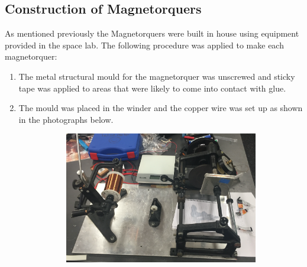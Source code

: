 \subsection{Construction of Magnetorquers}
As mentioned previously the Magnetorquers were built in house using equipment provided in the space lab.  The following procedure was applied to make each magnetorquer:
\begin{enumerate}
	\item The metal structural mould for the magnetorquer was unscrewed and sticky tape was applied to areas that were likely to come into contact with glue.
	\item The mould was placed in the winder and the copper wire was set up as shown in the photographs below.
	\begin{center}
	\begin{figure}[H]
	\caption{Magnetorquer Construction Set Up}
	\begin{subfigure}{0.5\textwidth}
	\includegraphics[scale = 0.35]{Construction_1.png}
	\end{subfigure}
	\hspace{10mm}
	\begin{subfigure}{0.5\textwidth}

\end{subfigure}
\end{figure}
\end{center}
\end{enumerate}
